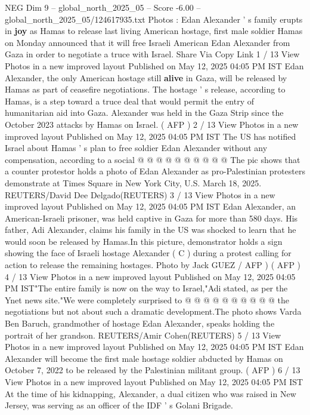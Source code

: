 \begin{textsample}{NEG Dim 9 – global\_north\_2025\_05 – Score -6.00 – global\_north\_2025\_05/124617935.txt}  \label{ex:f9_neg_178}
Photos : Edan Alexander ' s family erupts in \textbf{joy} as Hamas to release last living American hostage, first male soldier Hamas on Monday announced that it will free Israeli American Edan Alexander from Gaza in order to negotiate a truce with Israel.
Share Via Copy Link 1 / 13 View Photos in a new improved layout Published on May 12, 2025 04:05 PM IST Edan Alexander, the only American hostage still \textbf{alive} in Gaza, will be released by Hamas as part of ceasefire negotiations.
The hostage ' s release, according to Hamas, is a step toward a truce deal that would permit the entry of humanitarian aid into Gaza.
Alexander was held in the Gaza Strip since the October 2023 attacks by Hamas on Israel. ( AFP ) 2 / 13 View Photos in a new improved layout Published on May 12, 2025 04:05 PM IST The US has notified Israel about Hamas ' s plan to free soldier Edan Alexander without any compensation, according to a social @ @ @ @ @ @ @ @ @ @ The pic shows that a counter protestor holds a photo of Edan Alexander as pro-Palestinian protesters demonstrate at Times Square in New York City, U.S.
March 18, 2025.
REUTERS/David Dee Delgado(REUTERS) 3 / 13 View Photos in a new improved layout Published on May 12, 2025 04:05 PM IST Edan Alexander, an American-Israeli prisoner, was held captive in Gaza for more than 580 days.
His father, Adi Alexander, claims his family in the US was shocked to learn that he would soon be released by Hamas.In this picture, demonstrator holds a sign showing the face of Israeli hostage Alexander ( C ) during a protest calling for action to release the remaining hostages.
Photo by Jack GUEZ / AFP ) ( AFP ) 4 / 13 View Photos in a new improved layout Published on May 12, 2025 04:05 PM IST"The entire family is now on the way to Israel,"Adi stated, as per the Ynet news site."We were completely surprised to @ @ @ @ @ @ @ @ @ @ the negotiations but not about such a dramatic development.The photo shows Varda Ben Baruch, grandmother of hostage Edan Alexander, speaks holding the portrait of her grandson.
REUTERS/Amir Cohen(REUTERS) 5 / 13 View Photos in a new improved layout Published on May 12, 2025 04:05 PM IST Edan Alexander will become the first male hostage soldier abducted by Hamas on October 7, 2022 to be released by the Palestinian militant group. ( AFP ) 6 / 13 View Photos in a new improved layout Published on May 12, 2025 04:05 PM IST At the time of his kidnapping, Alexander, a dual citizen who was raised in New Jersey, was serving as an officer of the IDF ' s Golani Brigade.

\end{textsample}
